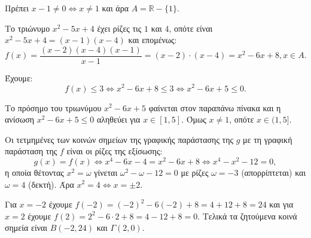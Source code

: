 
\begin{alist}
\item Πρέπει $x - 1 \ne 0 \Leftrightarrow x \ne 1$ και άρα $A = \mathbb{R} - \{1\}$.

\item Το τριώνυμο $x^2 - 5x + 4$ έχει ρίζες τις $1$ και $4$, οπότε είναι $x^2 - 5x + 4 = (x - 1)(x - 4)$ και
επομένως:
\[f(x) = \dfrac{(x - 2)(x - 4)(x - 1)}{x - 1} = (x - 2) \cdot (x - 4) = x^2 - 6x + 8, x \in A.\]

\item Έχουμε:
\[f(x) \le 3 \Leftrightarrow x^2 - 6x + 8 \le 3 \Leftrightarrow x^2 - 6x + 5 \le 0.\]
\begin{center}
\end{center}
Το πρόσημο του τριωνύμου $x^2 - 6x + 5$ φαίνεται στον παραπάνω πίνακα και η ανίσωση
$x^2 - 6x + 5 \le 0$ αληθεύει για $x \in [1, 5]$. Όμως $x \ne 1$, οπότε $x \in (1, 5]$.

\item Οι τετμημένες των κοινών σημείων της γραφικής παράστασης της $g$ με τη γραφική
παράσταση της $f$ είναι οι ρίζες της εξίσωσης:
\[g(x) = f(x) \Leftrightarrow x^4 - 6x - 4 = x^2 - 6x + 8 \Leftrightarrow x^4 - x^2 - 12 = 0,\]
η οποία θέτοντας $x^2 = \omega$ γίνεται
$\omega^2 - \omega - 12 = 0$ με ρίζες $\omega = -3$ (απορρίπτεται) και $\omega = 4$ (δεκτή).
Άρα $x^2 = 4 \Leftrightarrow x = \pm 2$.

Για $x = -2$ έχουμε $f(-2) = (-2)^2 - 6(-2) + 8 = 4 + 12 + 8 = 24$
και για $x = 2$ έχουμε $f(2) = 2^2 - 6 \cdot 2 + 8 = 4 - 12 + 8 = 0$.
Τελικά τα ζητούμενα κοινά σημεία είναι $B(-2, 24)$ και $\Gamma(2, 0)$.
\end{alist}

